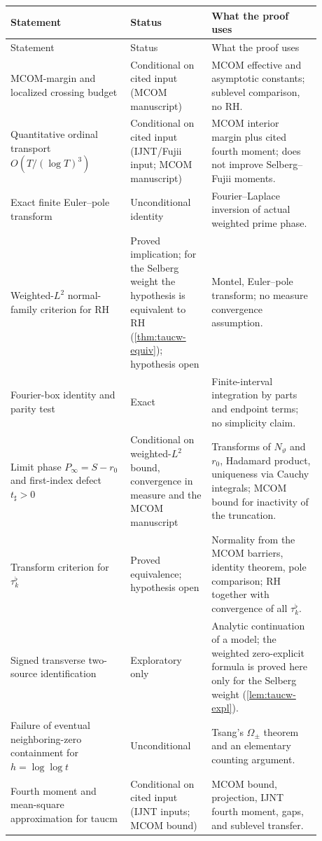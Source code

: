 \documentclass[11pt,a4paper]{article}
\numberwithin{equation}{section}
\theoremstyle{definition}
\theoremstyle{remark}
\begin{document}
\begin{longtable}{@{}p{0.34\linewidth}>{\raggedright\arraybackslash}p{0.23\linewidth}p{0.31\linewidth}@{}}
\toprule
Statement & Status & What the proof uses \\
\midrule
\endfirsthead
\toprule
Statement & Status & What the proof uses \\
\midrule
\endhead
MCOM-margin and localized crossing budget & Conditional on cited input (MCOM manuscript) & MCOM effective and asymptotic constants; sublevel comparison, no RH.\\
Quantitative ordinal transport $O(T/(\log T)^3)$ & Conditional on cited input (IJNT/Fujii input; MCOM manuscript) & MCOM interior margin plus cited fourth moment; does not improve Selberg--Fujii moments.\\
Exact finite Euler--pole transform & Unconditional identity & Fourier--Laplace inversion of actual weighted prime phase.\\
Weighted-$L^2$ normal-family criterion for RH & Proved implication; for the Selberg weight the hypothesis is equivalent to RH (\cref{thm:taucw-equiv}); hypothesis open & Montel, Euler--pole transform; no measure convergence assumption.\\
Fourier-box identity and parity test & Exact & Finite-interval integration by parts and endpoint terms; no simplicity claim.\\
Limit phase $P_\infty=S-r_0$ and first-index defect $t_\sharp>0$ & Conditional on weighted-$L^2$ bound, convergence in measure and the MCOM manuscript & Transforms of $N_\vartheta$ and $r_0$, Hadamard product, uniqueness via Cauchy integrals; MCOM bound for inactivity of the truncation.\\
Transform criterion for $\tau_k^\flat$ & Proved equivalence; hypothesis open & Normality from the MCOM barriers, identity theorem, pole comparison; RH together with convergence of all $\tau_k^\flat$.\\
Signed transverse two-source identification & Exploratory only & Analytic continuation of a model; the weighted zero-explicit formula is proved here only for the Selberg weight (\cref{lem:taucw-expl}).\\
Failure of eventual neighboring-zero containment for $h=\log\log t$ & Unconditional & Tsang's $\Omega_\pm$ theorem and an elementary counting argument.\\
Fourth moment and mean-square approximation for taucm & Conditional on cited input (IJNT inputs; MCOM bound) & MCOM bound, projection, IJNT fourth moment, gaps, and sublevel transfer.\\

\end{longtable}
\end{document}
